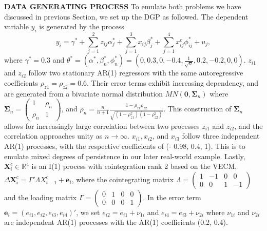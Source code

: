 \documentclass[12pt,a4paper]{article}
\begin{document}
\textbf{DATA GENERATING PROCESS} To emulate both problems we have discussed in previous Section, we set up the DGP as followed. The dependent variable $ y_i $ is generated by the process
	\[ y_i = \gamma^* + \sum^2_{j = 1}z_{ij}\alpha_j^* + 
	\sum^3_{j = 1}x_{ij}\beta^*_j +
	\sum^4_{j = 1}x^c_{ij}\phi^*_{ij} +
	u_j, \]
where $ \gamma^* = 0.3 $ and $ \theta^* = (\alpha^*, \beta^*_n, \phi^*_n) = (0, 0.3, 0, - 0.4, \frac{1}{\sqrt{n}}, 0.2, - 0.2, 0, 0) $. $ z_{i1} $ and $ z_{i2} $ follow two stationary AR(1) regressors with the same autoregressive coefficients $ \rho_{z1} = \rho_{z2} = 0.6 $. Their error terms exhibit increasing dependency, and are generated from a bivariate normal distribution $ MN(\bm{0}, \bm{\Sigma}_n) $ where $ \bm{\Sigma}_n =
 		\begin{pmatrix}
 			1 		& \rho_n \\
 			\rho_n 	& 1
 		\end{pmatrix}$, and $ \rho_n = \frac{n}{n + 1} \frac{1 - \rho_{z1}\rho_{z2}}{\sqrt{(1 - \rho_{z1} ^ 2)(1 - \rho_{z2} ^ 2)}} $. This construction of $ \bm{\Sigma}_n $ allows for increasingly large correlation between two processes $ z_{i1} $ and $ z_{i2} $, and the correlation approaches unity as $ n \rightarrow \infty $. $ x_{i1}, x_{i2} $, and $ x_{i3} $ follow three independent AR(1) processes, with the respective coefficients of (- 0.98, 0.4, 1). This is to emulate mixed degrees of persistence in our later real-world example. Lastly, $ \bm{X}^c_i \in \mathbb{R}^4 $ is an I(1) process with cointegration rank 2 based on the VECM, $ \Delta \bm{X}^c_i = \Gamma'\Lambda X^c_{i - 1} + \bm{e}_i $, where the cointegrating matrix $ \Lambda = \begin{pmatrix}
 			1 & - 1 & 0 & 0 \\
 			0 & 0 & 1 & -1
 		\end{pmatrix} $ and the loading matrix $ \Gamma = 
 		\begin{pmatrix}
 			0 & 1 & 0 & 0 \\
 			0 & 0 & 0 & 1
 		\end{pmatrix} $. In the error term $ \bm{e}_i = (e_{i1}, e_{i2}, e_{i3}, e_{i4})' $, we set $ e_{i2} = e_{i1} + \nu_{1i} $ and $ e_{i4} = e_{i3} + \nu_{2i} $ where $ \nu_{1i} $ and $ \nu_{2i} $ are independent AR(1) processes with the AR(1) coefficients (0.2, 0.4).
 
\end{document}
